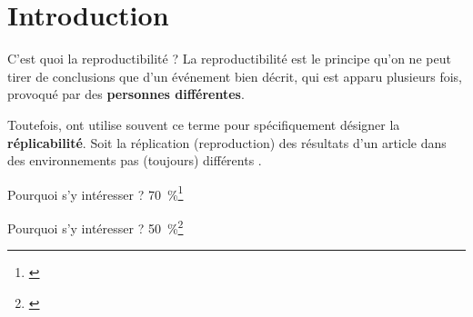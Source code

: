 \documentclass[aspectratio=169,10pt,xcolor=x11names,english,french]{beamer}
\begin{document}
	\section{Introduction}
	\begin{frame}{C'est quoi la reproductibilité ?}
		La reproductibilité est le principe qu'on ne peut tirer de conclusions que d'un événement bien décrit, qui est apparu plusieurs fois, provoqué par des \textbf{personnes différentes}.
		
		Toutefois, ont utilise souvent ce terme pour spécifiquement désigner la \textbf{réplicabilité}. Soit la réplication (reproduction) des résultats d'un article dans des environnements pas (toujours) différents \cite{replicationvsreproductiblity, pineau2020improving}.
		
	\end{frame}
	
	\begin{frame}{Pourquoi s'y intéresser ?}
		\centering
		\fontsize{35}{35}\selectfont\textcolor[cmyk]{0.67, 0.66, 0, 0.71}{70~\%}\footnote[1]{\cite{baker500ScientistsLift2016}}
		
	\end{frame}

	\begin{frame}{Pourquoi s'y intéresser ?}
	\centering
	\fontsize{35}{35}\selectfont\textcolor[cmyk]{0.67, 0.66, 0, 0.71}{50~\%}\footnote[1]{\cite{baker500ScientistsLift2016}}

		
	
	\end{frame}
\end{document}
